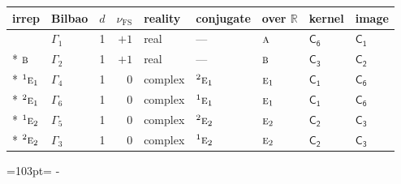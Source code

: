 \documentclass[10pt,a4paper]{article}
\newcommand{\needspace}[1]{\par\penalty-100\begingroup\dimen0=#1\relax\dimen2=\pagegoal
  \advance\dimen2-\pagetotal\ifdim\dimen0>\dimen2\relax\ifdim\dimen2>0pt\vfil\break\fi\fi
  \endgroup}
\numberwithin{equation}{section}
\newcommand{\grp}[1]{\mathsf{#1}}
\newcommand{\irr}[1]{\text{\normalfont\scshape #1}}
\newcommand{\conjpair}[1]{{}^{#1}}
\newcommand{\detbox}[1]{{\setlength{\fboxsep}{1pt}\fbox{#1}}}
\newcommand{\fsind}{\nu_{\mathrm{FS}}}
\begin{document}
{\small\renewcommand{\arraystretch}{1.25}\setlength{\tabcolsep}{4pt}\begin{longtable}{@{}llrrlllll@{}}\toprule
irrep & Bilbao & $d$ & $\fsind$ & reality & conjugate & over $\mathbb{R}$ & kernel & image\\\midrule\endhead
\bottomrule\endfoot\endlastfoot
\detbox{$\irr{a}$} & $\Gamma_{1}$ & 1 & $+1$ & real & --- & $\irr{a}$ & \href{C6.pdf}{$\grp{C_{6}}$} & \href{C1.pdf}{$\grp{C_{1}}$}\\*
$\irr{b}$ & $\Gamma_{2}$ & 1 & $+1$ & real & --- & $\irr{b}$ & \href{C3.pdf}{$\grp{C_{3}}$} & \href{C2.pdf}{$\grp{C_{2}}$}\\*
$\conjpair{1}\irr{e}_{1}$ & $\Gamma_{4}$ & 1 & $0$ & complex & $\conjpair{2}\irr{e}_{1}$ & $\irr{e}_{1}$ & \href{C1.pdf}{$\grp{C_{1}}$} & \href{C6.pdf}{$\grp{C_{6}}$}\\*
$\conjpair{2}\irr{e}_{1}$ & $\Gamma_{6}$ & 1 & $0$ & complex & $\conjpair{1}\irr{e}_{1}$ & $\irr{e}_{1}$ & \href{C1.pdf}{$\grp{C_{1}}$} & \href{C6.pdf}{$\grp{C_{6}}$}\\*
$\conjpair{1}\irr{e}_{2}$ & $\Gamma_{5}$ & 1 & $0$ & complex & $\conjpair{2}\irr{e}_{2}$ & $\irr{e}_{2}$ & \href{C2.pdf}{$\grp{C_{2}}$} & \href{C3.pdf}{$\grp{C_{3}}$}\\*
$\conjpair{2}\irr{e}_{2}$ & $\Gamma_{3}$ & 1 & $0$ & complex & $\conjpair{1}\irr{e}_{2}$ & $\irr{e}_{2}$ & \href{C2.pdf}{$\grp{C_{2}}$} & \href{C3.pdf}{$\grp{C_{3}}$}\\
\bottomrule\end{longtable}}
\needspace{103pt}
\end{document}
